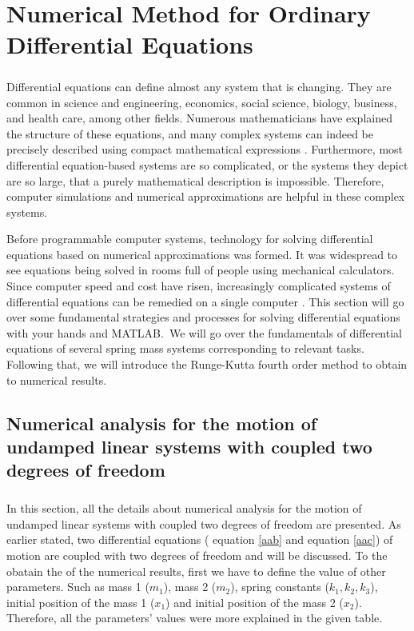 \chapter{Numerical Method for Ordinary Differential Equations}
\label{chap:04}

\paragraph{}

Differential equations can define almost any system that is changing. They are common in science and engineering, economics, social science, biology, business, and health care, among other fields. Numerous mathematicians have explained the structure of these equations, and many complex systems can indeed be precisely described using compact mathematical expressions \cite{atkinson2019data,braun1983differential}. Furthermore, most differential equation-based systems are so complicated, or the systems they depict are so large, that a purely mathematical description is impossible. Therefore, computer simulations and numerical approximations are helpful in these complex systems.

 Before programmable computer systems, technology for solving differential equations based on numerical approximations was formed. It was widespread to see equations being solved in rooms full of people using mechanical calculators. Since computer speed and cost have risen, increasingly complicated systems of differential equations can be remedied on a single computer \cite{epperson2021introduction}. This section will go over some fundamental strategies and processes for solving differential equations with your hands and MATLAB. We will go over the fundamentals of differential equations of several spring mass systems corresponding to relevant tasks. Following that, we will  introduce the Runge-Kutta fourth order method to obtain to numerical results. 


\section{Numerical analysis for the motion of undamped linear systems with coupled two degrees of freedom}
\label{sec:4.1}
\paragraph{}

In this section, all the details about numerical analysis for the motion of undamped linear systems with coupled two degrees of freedom are presented.  As earlier stated, two differential equations ( equation \eqref{aab} and equation \eqref{aac}) of motion are coupled with two degrees of freedom and will be discussed. To the obatain the of the numerical results, first we have to define the value of other parameters. Such as mass 1 ($m_1$), mass 2 ($m_2$), spring constants ($k_1,k_2,k_3$), initial position of the mass 1 ($x_1$) and initial position of the mass 2 ($x_2$). Therefore, all the parameters' values were more explained in the given table. 

